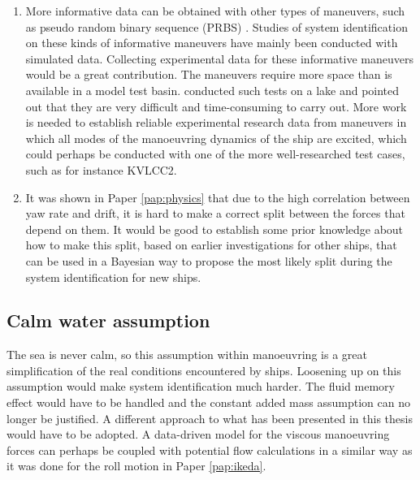 \begin{enumerate}[label=(\roman*),itemsep=1mm]
    
    \item More informative data can be obtained with other types of maneuvers, such as pseudo random binary sequence (PRBS) \cite{yoonIdentificationHydrodynamicCoefficients2003,wangOptimalDesignExcitation2020}. Studies of system identification on these kinds of informative maneuvers have mainly been conducted with simulated data. Collecting experimental data for these informative maneuvers would be a great contribution. The maneuvers require more space than is available in a model test basin. \textcite{millerShipModelIdentification2021} conducted such tests on a lake and pointed out that they are very difficult and time-consuming to carry out. 
More work is needed to establish reliable experimental research data from maneuvers in which all modes of the manoeuvring dynamics of the ship are excited, which could perhaps be conducted with one of the more well-researched test cases, such as for instance KVLCC2. 
    
    \item It was shown in Paper \ref{pap:physics} that due to the high correlation between yaw rate and drift, it is hard to make a correct split between the forces that depend on them. It would be good to establish some prior knowledge about how to make this split, based on earlier investigations for other ships, that can be used in a Bayesian way to propose the most likely split during the system identification for new ships.  
        
\end{enumerate}

\subsection*{Calm water assumption}
The sea is never calm, so this assumption within manoeuvring is a great simplification of the real conditions encountered by ships. Loosening up on this assumption would make system identification much harder. The fluid memory effect would have to be handled and the constant added mass assumption can no longer be justified. A different approach to what has been presented in this thesis would have to be adopted. A data-driven model for the viscous manoeuvring forces can perhaps be coupled with potential flow calculations in a similar way as it was done for the roll motion in Paper \ref{pap:ikeda}.  
    
